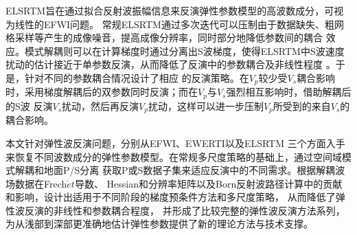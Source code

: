 \begin{cabstract}
	ELSRTM旨在通过拟合反射波振幅信息来反演弹性参数模型的高波数成分，可视为线性的EFWI问题。
	常规ELSRTM通过多次迭代可以压制由于数据缺失、粗网格采样等产生的成像噪音，提高成像分辨率，同时部分地降低参数间的耦合
	效应。模式解耦则可以在计算梯度时通过分离出S波梯度，使得ELSRTM中S波速度扰动的估计接近于单参数反演，从而降低了反演中的参数耦合及非线性程度
	。于是，针对不同的参数耦合情况设计了相应
	的反演策略。在$V_p$较少受$V_s$耦合影响时，采用梯度解耦后的双参数同时反演；而在$V_p$与$V_s$强烈相互影响时，借助解耦后的S波
	反演$V_s$扰动，然后再反演$V_p$扰动，这样可以进一步压制$V_p$所受到的来自$V_s$的耦合影响。

	本文针对弹性波反演问题，分别从EFWI、EWERTI以及ELSRTM
	三个方面入手来恢复不同波数成分的弹性参数模型。在常规多尺度策略的基础上，通过空间域模式解耦和地面P/S分离
	获取P或S数据子集来适应反演中的不同需求。根据解耦波场数据在Frech$\acute{e}t$导数、
	Hessian和分辨率矩阵以及Born反射波路径计算中的贡献和影响，设计出适用于不同阶段的梯度预条件方法和多尺度策略，
	从而降低了弹性波反演的非线性和参数耦合程度，
	并形成了比较完整的弹性波反演方法系列，为从浅部到深部更准确地估计弹性参数提供了新的理论方法与技术支撑。


\end{cabstract}


